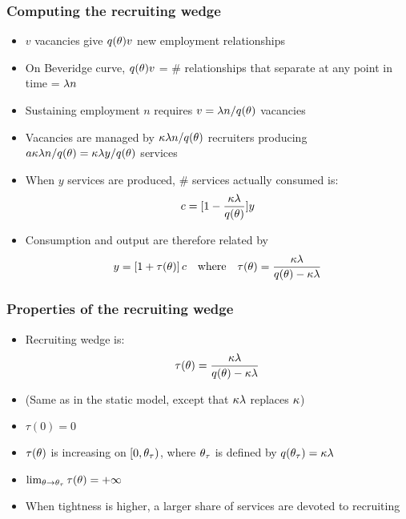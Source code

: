 \documentclass[11pt,aspectratio=169,xcolor={dvipsnames},hyperref={pdftex,pdfpagemode=UseNone,hidelinks,pdfdisplaydoctitle=true},usepdftitle=false]{beamer}
\begin{document}
\begin{frame}
\frametitle{Computing the recruiting wedge}
\begin{itemize}
\item $v$ vacancies give $q(\theta) v$ new employment relationships
\item On Beveridge curve, $q(\theta) v$ =  \# relationships that separate at any point in time = $\lambda n$
\item Sustaining employment $n$ requires $v = \lambda n/q(\theta)$ vacancies
\item Vacancies are managed by $\kappa \lambda n/q(\theta)$ recruiters producing $a \kappa \lambda n/q(\theta) = \kappa \lambda y/q(\theta)$ services 
\item When $y$ services are produced, \# services actually consumed is:
\begin{equation*}
c = [1- \frac{\kappa\lambda}{q(\theta)}] y
\end{equation*}
\item Consumption and output are therefore related by
\begin{equation*}
y = \left[ 1+\tau(\theta) \right] c \quad \text{where}\quad \tau(\theta) = \frac{\kappa  \lambda}{q(\theta)-\kappa  \lambda}
\end{equation*}
\end{itemize}	
\end{frame}

\begin{frame}
\frametitle{Properties of the recruiting wedge}
\begin{itemize}
\item Recruiting wedge is:
\begin{equation*}
\tau(\theta) = \frac{\kappa  \lambda}{q(\theta)-\kappa  \lambda}
\end{equation*}
\item (Same as in the static model, except that $\kappa\lambda$ replaces $\kappa$)
\item $\tau(0)=0$
\item $\tau(\theta)$ is increasing on $[0,\theta_{\tau})$, where $\theta_{\tau}$ is defined by $q(\theta_{\tau}) = \kappa \lambda$
\item $\lim_{\theta\to \theta_{\tau}} \tau(\theta) = + \infty$
\item When tightness is higher, a larger share of services are devoted to recruiting
\end{itemize}	
\end{frame}
\end{document}
